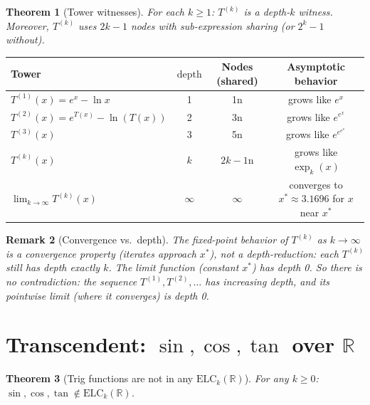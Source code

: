 \documentclass[11pt]{article}
\newtheorem{theorem}{Theorem}
\newtheorem{remark}[theorem]{Remark}
\begin{document}
\begin{theorem}[Tower witnesses]
For each $k \geq 1$: $T^{(k)}$ is a depth-$k$ witness.
Moreover, $T^{(k)}$ uses $2k-1$ nodes with sub-expression sharing (or $2^k-1$ without).
\end{theorem}

\begin{center}
\begin{tabular}{lccc}
\toprule
Tower & $\mathrm{depth}$ & Nodes (shared) & Asymptotic behavior \\
\midrule
$T^{(1)}(x) = e^x - \ln x$ & 1 & 1n & grows like $e^x$ \\
$T^{(2)}(x) = e^{T(x)} - \ln(T(x))$ & 2 & 3n & grows like $e^{e^x}$ \\
$T^{(3)}(x)$ & 3 & 5n & grows like $e^{e^{e^x}}$ \\
$T^{(k)}(x)$ & $k$ & $2k-1$n & grows like $\exp_k(x)$ \\
$\lim_{k\to\infty} T^{(k)}(x)$ & $\infty$ & $\infty$ & converges to $x^* \approx 3.1696$ for $x$ near $x^*$ \\
\bottomrule
\end{tabular}
\end{center}

\begin{remark}[Convergence vs.\ depth]
The fixed-point behavior of $T^{(k)}$ as $k\to\infty$ is a convergence property
(iterates approach $x^*$), not a depth-reduction: each $T^{(k)}$ still
has depth exactly $k$. The limit function (constant $x^*$) has depth 0.
So there is no contradiction: the sequence $T^{(1)}, T^{(2)},\ldots$ has increasing depth,
and its pointwise limit (where it converges) is depth 0.
\end{remark}

\section{Transcendent: $\sin, \cos, \tan$ over $\mathbb{R}$}
\label{sec:trig}

\begin{theorem}[Trig functions are not in any $\mathrm{ELC}_k(\mathbb{R})$]
\label{thm:trig}
For any $k \geq 0$: $\sin, \cos, \tan \notin \mathrm{ELC}_k(\mathbb{R})$.
\end{theorem}
\end{document}
